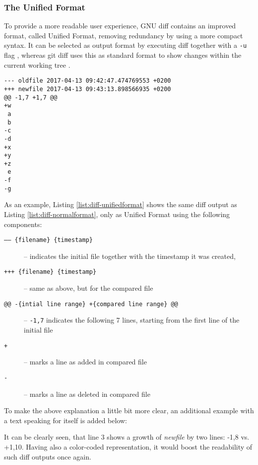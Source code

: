 \vspace{20pt}
\subsubsection{The Unified Format}

To provide a more readable user experience, GNU diff contains an improved format, called Unified Format, removing redundancy by using a more compact syntax. It can be selected as output format by executing diff together with a \texttt{-u} flag \cite[16]{mackenzie2003comparing}, whereas git diff uses this as standard format to show changes within the current working tree \cite{GitDiff}.


\begin{lstlisting}[label={list:diff-unifiedformat}, caption=unified\_format.diff]
--- oldfile	2017-04-13 09:42:47.474769553 +0200
+++ newfile	2017-04-13 09:43:13.898566935 +0200
@@ -1,7 +1,7 @@
+w
 a
 b
-c
-d
+x
+y
+z
 e
-f
-g
\end{lstlisting}

As an example, Listing \ref{list:diff-unifiedformat} shows the same diff output as Listing \ref{list:diff-normalformat}, only as Unified Format using the following components:

\begin{description}
  \item[\texttt{------ \{filename\} \{timestamp\}}] -- indicates the initial file together with the timestamp it was created,
  \item[\texttt{+++ \{filename\} \{timestamp\}}] -- same as above, but for the compared file
  \item[\texttt{@@ -\{intial line range\} +\{compared line range\} @@}] -- \texttt{-1,7} indicates the following 7 lines, starting from the first line of the initial file
  \item[\texttt{+}] -- marks a line as added in compared file
  \item[\texttt{-}] -- marks a line as deleted in compared file
\end{description}

To make the above explanation a little bit more clear, an additional example with a text speaking for itself is added below:



It can be clearly seen, that line 3 shows a growth of \emph{newfile} by two lines: -1,8 vs. +1,10. Having also a color-coded representation, it would boost the readability of such diff outputs once again.


